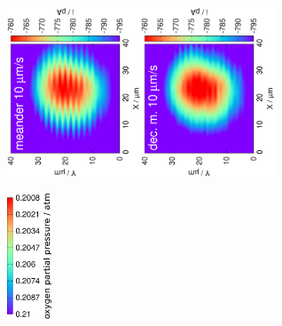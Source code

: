\documentclass{beamer}
\begin{document}
\begin{frame}[plain]

        \centering
        \includegraphics[trim = 10mm 20mm 0mm 20mm, clip, width=0.3\textwidth, angle=-90]{9_41.eps}\includegraphics[trim = 10mm 20mm 0mm 20mm, clip, width=0.3\textwidth, angle=-90]{9_41_meandered_deconvoluted.eps}

\includegraphics[width=0.1\textwidth, angle=-90]{atm.eps}


\vfill
\end{frame}
\end{document}
